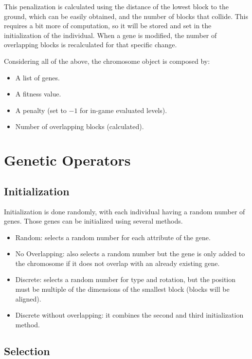 This penalization is calculated using the distance of the lowest block to the ground, which can be easily obtained, and the number of blocks that collide. This requires a bit more of computation, so it will be stored and set in the initialization of the individual. When a gene is modified, the number of overlapping blocks is recalculated for that specific change.

Considering all of the above, the chromosome object is composed by:
\begin{itemize}
	\item A list of genes.
	\item A fitness value.
	\item A penalty (set to $-1$ for in-game evaluated levels).
	\item Number of overlapping blocks (calculated).
\end{itemize}

\section{Genetic Operators}

\subsection{Initialization}\label{ga:init}

Initialization is done randomly, with each individual having a random number of genes. Those genes can be initialized using several methods. 

\begin{itemize}
	\item Random: selects a random number for each attribute of the gene.
	\item No Overlapping: also selects a random number but the gene is only added to the chromosome if it does not overlap with an already existing gene.
	\item Discrete: selects a random number for type and rotation, but the position must be multiple of the dimensions of the smallest block (blocks will be aligned).
	\item Discrete without overlapping: it combines the second and third initialization method.
\end{itemize}

\subsection{Selection}\label{ga:select}

